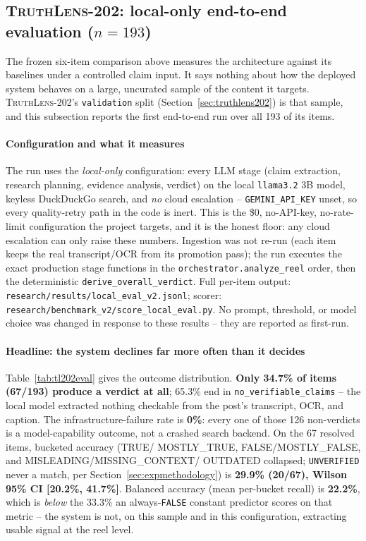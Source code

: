 \documentclass[conference]{IEEEtran}
\begin{document}
\subsection{\textsc{TruthLens-202}: local-only end-to-end evaluation ($n=193$)}
\label{sec:tl202eval}
The frozen six-item comparison above measures the architecture against
its baselines under a controlled claim input. It says nothing about how
the deployed system behaves on a large, uncurated sample of the content
it targets. \textsc{TruthLens-202}'s \texttt{validation} split
(Section~\ref{sec:truthlens202}) is that sample, and this subsection
reports the first end-to-end run over all 193 of its items.

\paragraph{Configuration and what it measures}
The run uses the \emph{local-only} configuration: every LLM stage
(claim extraction, research planning, evidence analysis, verdict) on the
local \texttt{llama3.2} 3B model, keyless DuckDuckGo search, and
\emph{no} cloud escalation -- \texttt{GEMINI\_API\_KEY} unset, so every
quality-retry path in the code is inert. This is the \$0, no-API-key,
no-rate-limit configuration the project targets, and it is the honest
floor: any cloud escalation can only raise these numbers. Ingestion was
not re-run (each item keeps the real transcript/OCR from its promotion
pass); the run executes the exact production stage functions in the
\texttt{orchestrator.analyze\_reel} order, then the deterministic
\texttt{derive\_overall\_verdict}. Full per-item output:
\texttt{research/results/local\_eval\_v2.jsonl}; scorer:
\texttt{research/benchmark\_v2/score\_local\_eval.py}. No prompt,
threshold, or model choice was changed in response to these results --
they are reported as first-run.

\paragraph{Headline: the system declines far more often than it decides}
Table~\ref{tab:tl202eval} gives the outcome distribution.
\textbf{Only 34.7\% of items (67/193) produce a verdict at all};
65.3\% end in \texttt{no\_verifiable\_claims} -- the local model
extracted nothing checkable from the post's transcript, OCR, and
caption. The infrastructure-failure rate is \textbf{0\%}: every one of
those 126 non-verdicts is a model-capability outcome, not a crashed
search backend. On the 67 resolved items, bucketed accuracy (TRUE/
MOSTLY\_TRUE, FALSE/MOSTLY\_FALSE, and MISLEADING/MISSING\_CONTEXT/
OUTDATED collapsed; \texttt{UNVERIFIED} never a match, per
Section~\ref{sec:expmethodology}) is \textbf{29.9\% (20/67), Wilson 95\% CI
[20.2\%, 41.7\%]}. Balanced accuracy (mean per-bucket recall) is
\textbf{22.2\%}, which is \emph{below} the 33.3\% an always-\texttt{FALSE}
constant predictor scores on that metric -- the system is not, on this
sample and in this configuration, extracting usable signal at the
reel level.
\end{document}
